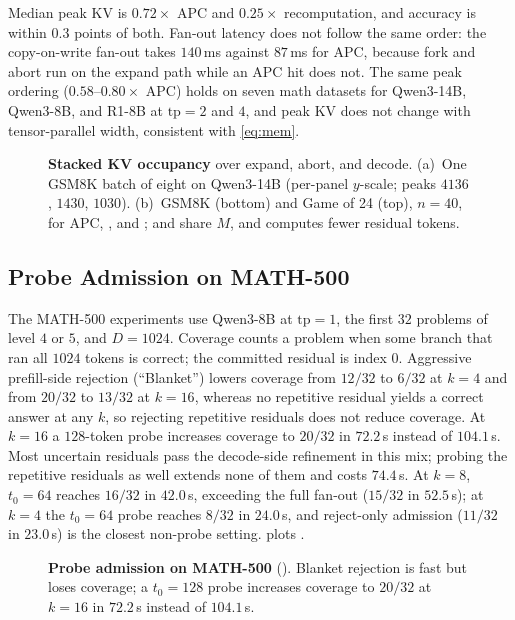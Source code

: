 Median peak KV is $0.72\times$ APC and $0.25\times$ recomputation, and accuracy is within $0.3$ points of both.
Fan-out latency does not follow the same order: the copy-on-write fan-out takes $140$\,ms against $87$\,ms for APC, because fork and abort run on the expand path while an APC hit does not.
The same peak ordering ($0.58$--$0.80\times$ APC) holds on seven math datasets for Qwen3-14B, Qwen3-8B, and R1-8B at $\mathrm{tp}{=}2$ and $4$, and peak KV does not change with tensor-parallel width, consistent with \eqref{eq:mem}.

\begin{figure}[t]
\centering
\resizebox{\textwidth}{!}{}
\caption{\textbf{Stacked KV occupancy} over expand, abort, and decode.
(a)~One GSM8K batch of eight on Qwen3-14B (per-panel $y$-scale; peaks $4136$, $1430$, $1030$).
(b)~GSM8K (bottom) and Game of 24 (top), $n{=}40$, for APC, \cowonly, and \sys; \cowonly and \sys share $M$, and \sys computes fewer residual tokens.}
\label{fig:eval-stack}
\end{figure}

\subsection{Probe Admission on MATH-500}
\label{sec:eval-grow}

The MATH-500 experiments use Qwen3-8B at $\mathrm{tp}{=}1$, the first $32$ problems of level $4$ or $5$, and $D{=}1024$.
Coverage counts a problem when some branch that ran all $1024$ tokens is correct; the committed residual is index $0$.
Aggressive prefill-side rejection (``Blanket'') lowers coverage from $12/32$ to $6/32$ at $k{=}4$ and from $20/32$ to $13/32$ at $k{=}16$, whereas no repetitive residual yields a correct answer at any $k$, so rejecting repetitive residuals does not reduce coverage.
At $k{=}16$ a $128$-token probe increases coverage to $20/32$ in $72.2$\,s instead of $104.1$\,s.
Most uncertain residuals pass the decode-side refinement in this mix; probing the repetitive residuals as well extends none of them and costs $74.4$\,s.
At $k{=}8$, $t_0{=}64$ reaches $16/32$ in $42.0$\,s, exceeding the full fan-out ($15/32$ in $52.5$\,s); at $k{=}4$ the $t_0{=}64$ probe reaches $8/32$ in $24.0$\,s, and reject-only admission ($11/32$ in $23.0$\,s) is the closest non-probe setting.
 plots .

\begin{figure}[t]
\centering
\resizebox{\textwidth}{!}{}
\caption{\textbf{Probe admission on MATH-500} ().
Blanket rejection is fast but loses coverage; a $t_0{=}128$ probe increases coverage to $20/32$ at $k{=}16$ in $72.2$\,s instead of $104.1$\,s.}
\label{fig:eval-grow}
\end{figure}

